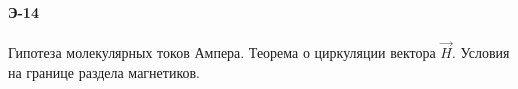 \documentclass[__main__.tex]{subfiles}
\begin{document}
\paragraph{Э-14}
Гипотеза молекулярных токов Ампера. Теорема о циркуляции вектора $\vec{H}$. Условия на границе раздела магнетиков.\\
\end{document}
